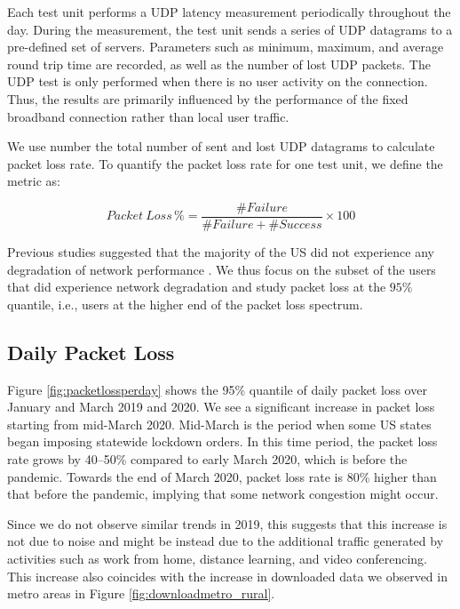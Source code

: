 Each test unit performs a UDP latency measurement periodically throughout the day. During the measurement, the test unit sends a series of UDP datagrams to a pre-defined set of servers. Parameters such as minimum, maximum, and average round  trip time are recorded, as well as the number of lost UDP packets. The UDP test is only performed when there is no user activity on the connection. Thus, the results are primarily influenced by the performance of the fixed broadband connection rather than local user traffic.

We use number the total number of sent and lost UDP datagrams to calculate packet loss rate. To quantify the packet loss rate for one test unit, we define the metric as:

\begin{equation}
    Packet \ Loss\, \% = \frac{\#Failure }{\#Failure + \#Success} \times 100
\end{equation}

Previous studies suggested that the majority of the US did not experience any degradation of network performance \cite{kovacs}. We thus focus on the subset of the users that did experience network degradation and study packet loss at the $95\%$ quantile, i.e., users at the higher end of the packet loss spectrum.

\subsection{Daily Packet Loss}

Figure \ref{fig:packetlossperday} shows the 95\% quantile of daily packet loss over January and March 2019 and 2020. We see a significant increase in packet loss starting from mid-March 2020. Mid-March is the period when some US states began imposing statewide lockdown orders. In this time period, the packet loss rate grows by 40--50\% compared to early March 2020, which is before the pandemic. Towards the end of March 2020, packet loss rate is 80\% higher than that before the pandemic, implying that some network congestion might occur.

Since we do not observe similar trends in 2019, this suggests that this increase is not due to noise and might be instead due to the additional traffic generated by activities such as work from home, distance learning, and video conferencing. This increase also coincides with the increase in downloaded data we observed in metro areas in Figure \ref{fig:downloadmetro_rural}.


